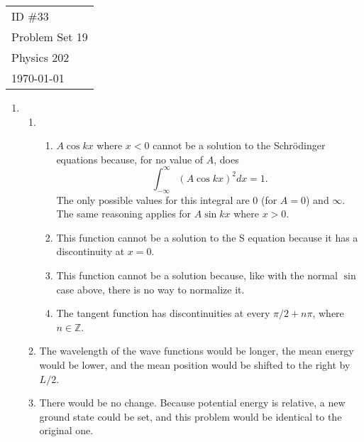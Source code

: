 \documentclass[fleqn]{article}[12pt]
\newcommand{\Z}{\mathbb{Z}}
\begin{document}
    \begin{tabular}{l}
        ID \#33 \\
        Problem Set 19 \\
        Physics 202 \\
        \today
    \end{tabular}

\begin{enumerate}
    \item \begin{enumerate}
        \item \begin{enumerate}
            \item $A \cos kx$ where $x<0$ cannot be a solution to the Schr\"odinger equations because, for no value of $A$, does
            \begin{equation*}
                \int_{-\infty}^{\infty} (A \cos kx)^2 dx = 1.
            \end{equation*}
            The only possible values for this integral are 0 (for $A=0$) and $\infty$. The same reasoning applies for $A \sin kx$ where $x>0$.

            \item This function cannot be a solution to the S equation because it has a discontinuity at $x=0$.

            \item This function cannot be a solution because, like with the normal $\sin$ case above, there is no way to normalize it.

            \item The tangent function has discontinuities at every $\pi/2 + n \pi$, where $n \in \Z$.
        \end{enumerate}

        \item The wavelength of the wave functions would be longer, the mean energy would be lower, and the mean position would be shifted to the right by $L/2$.

        \item There would be no change. Because potential energy is relative, a new ground state could be set, and this problem would be identical to the original one.
    \end{enumerate}


\end{enumerate}
\end{document}

